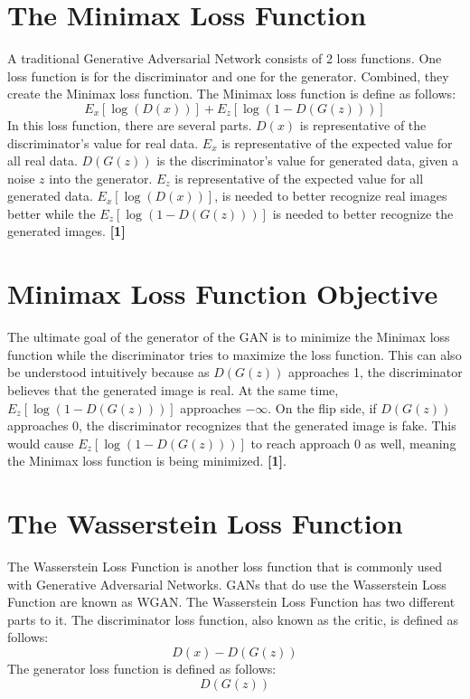 \documentclass{cup-pan}
\begin{document}
\section{The Minimax Loss Function}

A traditional Generative Adversarial Network consists of 2 loss functions. One loss function is for the discriminator and one for the generator. Combined, they create the Minimax loss function. The Minimax loss function is define as follows:
\begin{equation}
E_x[\log (D(x))] + E_z[\log (1 - D(G(z)))] 
\end{equation}
In this loss function, there are several parts. $D(x)$ is representative of the discriminator's value for real data. $E_x$ is representative of the expected value for all real data. $D(G(z))$ is the discriminator's value for generated data, given a noise $z$ into the generator. $E_z$ is representative of the expected value for all generated data. $E_x[\log (D(x))]$, is needed to better recognize real images better while the $ E_z[\log (1 - D(G(z)))]$ is needed to better recognize the generated images. \textbf{[1]}

\section{Minimax Loss Function Objective}
The ultimate goal of the generator of the GAN is to minimize the Minimax loss function while the discriminator tries to maximize the loss function. This can also be understood intuitively because as $D(G(z))$ approaches 1, the discriminator believes that the generated image is real. At the same time, $E_z[\log (1 - D(G(z)))]$ approaches $-\infty$. On the flip side, if $D(G(z))$ approaches 0, the discriminator recognizes that the generated image is fake. This would cause $E_z[\log (1 - D(G(z)))]$ to reach approach 0 as well, meaning the Minimax loss function is being minimized. \textbf{[1]}.

\section{The Wasserstein Loss Function}

The Wasserstein Loss Function is another loss function that is commonly used with Generative Adversarial Networks. GANs that do use the Wasserstein Loss Function are known as WGAN. The Wasserstein Loss Function has two different parts to it. The discriminator loss function, also known as the critic, is defined as follows:
\begin{equation}
D(x) - D(G(z))
\end{equation}
The generator loss function is defined as follows:
\begin{equation}
D(G(z))
\end{equation}
\end{document}
